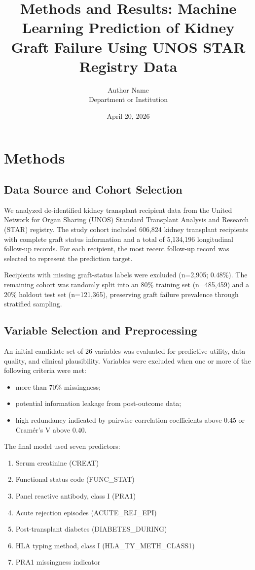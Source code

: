\documentclass[11pt,a4paper]{article}
\title{Methods and Results: Machine Learning Prediction of Kidney Graft Failure Using UNOS STAR Registry Data}
\author{Author Name\\Department or Institution}
\date{April 20, 2026}
\begin{document}
\maketitle

\section{Methods}

\subsection{Data Source and Cohort Selection}
We analyzed de-identified kidney transplant recipient data from the United Network for Organ Sharing (UNOS) Standard Transplant Analysis and Research (STAR) registry. The study cohort included 606,824 kidney transplant recipients with complete graft status information and a total of 5,134,196 longitudinal follow-up records. For each recipient, the most recent follow-up record was selected to represent the prediction target.

Recipients with missing graft-status labels were excluded (n=2,905; 0.48\%). The remaining cohort was randomly split into an 80\% training set (n=485,459) and a 20\% holdout test set (n=121,365), preserving graft failure prevalence through stratified sampling.

\subsection{Variable Selection and Preprocessing}
An initial candidate set of 26 variables was evaluated for predictive utility, data quality, and clinical plausibility. Variables were excluded when one or more of the following criteria were met:
\begin{itemize}
    \item more than 70\% missingness;
    \item potential information leakage from post-outcome data;
    \item high redundancy indicated by pairwise correlation coefficients above 0.45 or Cramér's V above 0.40.
\end{itemize}

The final model used seven predictors:
\begin{enumerate}
    \item Serum creatinine (CREAT)
    \item Functional status code (FUNC\_STAT)
    \item Panel reactive antibody, class I (PRA1)
    \item Acute rejection episodes (ACUTE\_REJ\_EPI)
    \item Post-transplant diabetes (DIABETES\_DURING)
    \item HLA typing method, class I (HLA\_TY\_METH\_CLASS1)
    \item PRA1 missingness indicator
\end{enumerate}
\end{document}
